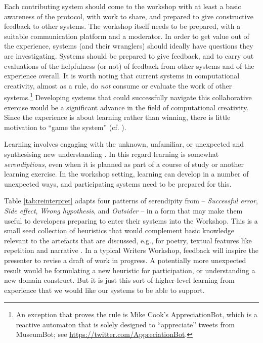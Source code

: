 Each contributing system should come to the workshop with at least a
basic awareness of the protocol, with work to share, and prepared to
give constructive feedback to other systems.  The workshop itself
needs to be prepared, with a suitable communication platform and a
moderator.  In order to get value out of the experience, systems (and
their wranglers) should ideally have questions they are investigating.
Systems should be prepared to give feedback, and to carry out
evaluations of the helpfulness (or not) of feedback from other systems
and of the experience overall.  It is worth noting that current
systems in computational creativity, almost as a rule, do \emph{not}
consume or evaluate the work of other systems.\footnote{An exception
  that proves the rule is Mike Cook's {\sf AppreciationBot}, which is
  a reactive automaton that is solely designed to ``appreciate''
  tweets from {\sf MuseumBot}; see
  \url{https://twitter.com/AppreciationBot}.}  Developing systems that
could successfully navigate this collaborative exercise would be a
significant advance in the field of computational creativity.  Since
the experience is about learning rather than winning, there is little
motivation to ``game the system'' (cf. ).

Learning involves engaging with the unknown, unfamiliar, or unexpected
and synthesising new understanding \cite{deleuze1994difference}.  In
this regard learning is somewhat \emph{serendiptious}, even when it is
planned as part of a course of study or another learning exercise.  In the
workshop setting, learning can develop in a number of unexpected
ways, and participating systems need to be prepared for this.

Table \ref{tab:reinterpret} adapts four patterns of serendipity from
 -- \emph{Successful error}, \emph{Side effect},
\emph{Wrong hypothesis}, and \emph{Outsider} -- in a form that may
make them useful to developers preparing to enter their systems into
the Workshop.  This is a small seed collection of heuristics that
would complement basic knowledge relevant to the artefacts that are
discussed, e.g., for poetry, textual features like repetition and
narrative \cite{corneli15iccc}.  In a typical Writers Workshop,
feedback will inspire the presenter to revise a draft of work in
progress.  A potentially more unexpected result would be formulating a
new heuristic for participation, or understanding a new domain
construct.  But it is just this sort of higher-level learning from
experience that we would like our systems to be able to support.

